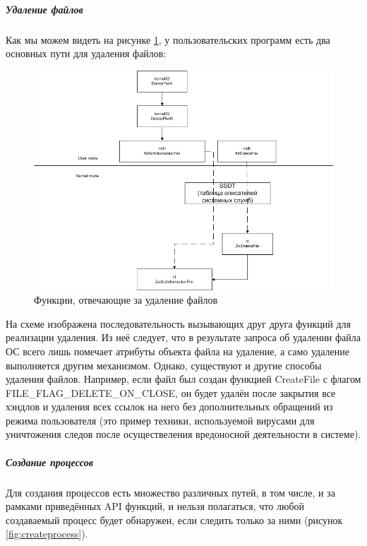 \subparagraph {Удаление файлов}
Как мы можем видеть на рисунке \ref{fig:filedelete}, у пользовательских программ есть два основных пути
для удаления файлов:
\begin {figure}[h]
	\centering
	\includegraphics[width=\linewidth]{img/DeleteFileAPIs.png}
	\caption{Функции, отвечающие за удаление файлов}
	\label{fig:filedelete}
\end {figure}
На схеме изображена последовательность вызывающих друг друга функций для реализации удаления. Из неё следует, что в результате запроса об удалении файла ОС всего лишь помечает атрибуты объекта файла на удаление, а само удаление выполняется другим механизмом. Однако, существуют и другие способы удаления файлов. Например, если файл был создан функцией CreateFile с флагом FILE\_FLAG\_DELETE\_ON\_CLOSE, он будет удалён после закрытия все хэндлов и удаления всех ссылок на него без дополнительных обращений из режима пользователя (это пример техники, используемой вирусами для уничтожения следов после осуществеления вредоносной деятельности в системе).
\subparagraph {Создание процессов}
Для создания процессов есть множество различных путей, в том числе, и за рамками приведённых API функций, и нельзя полагаться, что любой создаваемый процесс будет обнаружен, если следить только за ними (рисунок  \ref{fig:createprocess}).
